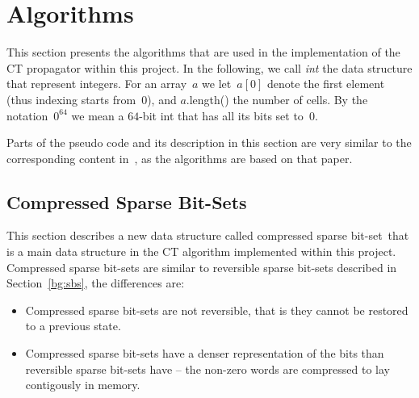 \documentclass[a4paper,11pt]{article}
\newcommand{\Secref}[1]{Section~\ref{#1}}
\newcommand{\BitSet}[0]{Compressed Sparse Bit-Set}
\newcommand{\bitset}[0]{compressed sparse bit-set}
\newcommand{\Bitset}[0]{Compressed sparse bit-set}
\newcommand{\CTpaper}[0]{DBLP:conf/cp/DemeulenaereHLP16}
\numberwithin{equation}{section}
\begin{document}

\section{Algorithms}
\label{sec:algorithms}


This section presents the algorithms that are used in the implementation of the
CT propagator within this project.
In the following, we call \emph{int} the data structure that represent
integers. For an array~$a$ we let~$a[0]$ denote the first element
(thus indexing starts from~$0$), and
$a$.length() the number of cells.
By the notation~$0^{64}$ we mean a $64$-bit int that has all its
bits set to~$0$.

Parts of the pseudo code and its description in this section are very
similar to the corresponding content in~\cite{\CTpaper}, as the algorithms
are based on that paper.


\subsection{{\BitSet}s}
\label{sec:sbs}
This section describes a new data structure called 
\bitset~that is a main data structure
in the CT algorithm implemented within this project. {\Bitset}s are similar to
reversible sparse bit-sets described in \Secref{bg:sbs},
the differences are:
\begin{itemize}
  \item {\Bitset}s are not reversible, that is they cannot be restored to a previous
    state.
  \item {\Bitset}s have a denser representation of the bits than reversible sparse
    bit-sets have -- the non-zero words are compressed to lay contigously in memory.
\end{itemize}
\end{document}
